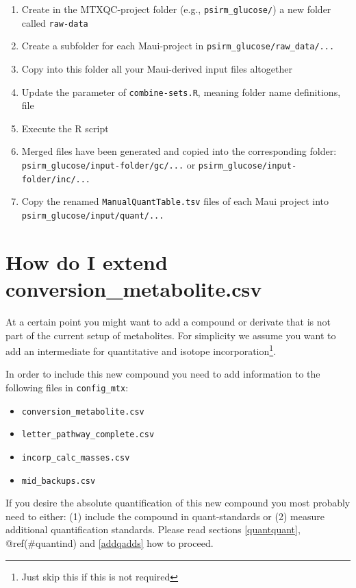 \documentclass[]{book}
\providecommand{\tightlist}{%
  \setlength{\itemsep}{0pt}\setlength{\parskip}{0pt}}
\let\rmarkdownfootnote\footnote%
\def\footnote{\protect\rmarkdownfootnote}
\theoremstyle{definition}
\theoremstyle{definition}
\theoremstyle{definition}
\theoremstyle{remark}
\begin{document}
\begin{enumerate}
\def\labelenumi{\arabic{enumi}.}
\tightlist
\item
  Create in the MTXQC-project folder (e.g., \texttt{psirm\_glucose/}) a
  new folder called \texttt{raw-data}
\item
  Create a subfolder for each Maui-project in
  \texttt{psirm\_glucose/raw\_data/...}
\item
  Copy into this folder all your Maui-derived input files altogether
\item
  Update the parameter of \texttt{combine-sets.R}, meaning folder name
  definitions, file
\item
  Execute the R script
\item
  Merged files have been generated and copied into the corresponding
  folder: \texttt{psirm\_glucose/input-folder/gc/...} or
  \texttt{psirm\_glucose/input-folder/inc/...}
\item
  Copy the renamed \texttt{ManualQuantTable.tsv} files of each Maui
  project into \texttt{psirm\_glucose/input/quant/...}
\end{enumerate}

\section{How do I extend conversion\_metabolite.csv}\label{extendconse}

At a certain point you might want to add a compound or derivate that is
not part of the current setup of metabolites. For simplicity we assume
you want to add an intermediate for quantitative and isotope
incorporation\footnote{Just skip this if this is not required}.

In order to include this new compound you need to add information to the
following files in \texttt{config\_mtx}:

\begin{itemize}
\tightlist
\item
  \texttt{conversion\_metabolite.csv}
\item
  \texttt{letter\_pathway\_complete.csv}
\item
  \texttt{incorp\_calc\_masses.csv}
\item
  \texttt{mid\_backups.csv}
\end{itemize}

If you desire the absolute quantification of this new compound you most
probably need to either: (1) include the compound in quant-standards or
(2) measure additional quantification standards. Please read sections
\ref{quantquant}, @ref(\#quantind) and \ref{addqadds} how to proceed.
\end{document}
